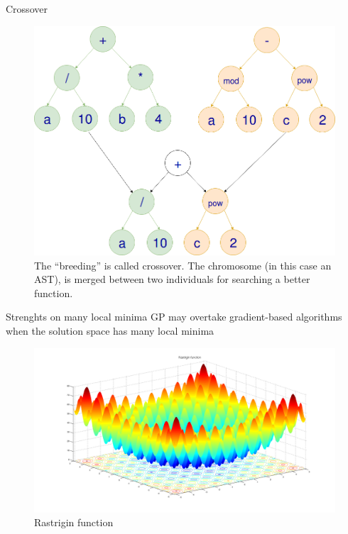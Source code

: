 \documentclass[aspectratio=169]{beamer}
\begin{document}
\begin{frame}{Crossover}
	\begin{figure}
		\includegraphics[scale=0.15]{img/ast-crossover.png}
		\caption{The “breeding” is called crossover. The chromosome (in this case an \textsc{AST}), is merged between two individuals for searching a better function.}
	\end{figure}	
\end{frame}

\begin{frame}{Strenghts on many local minima}
\textsc{GP} may overtake gradient-based algorithms when the solution space has many local minima
	\begin{figure}
		\includegraphics[scale=0.16]{img/Rastrigin_function.png}
		\caption{Rastrigin function}
	\end{figure}
\end{frame}
\end{document}
